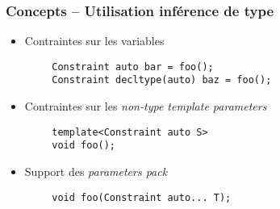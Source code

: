 \documentclass[C++.tex]{subfiles}
\begin{document}
\begin{frame}[fragile]
	\frametitle{Concepts -- Utilisation inférence de type}
	\begin{itemize}
		\item Contraintes sur les variables
	\end{itemize}

	\begin{verbatim}
		Constraint auto bar = foo();
		Constraint decltype(auto) baz = foo();
	\end{verbatim}

	\begin{itemize}
		\item Contraintes sur les \textit{non-type template parameters}
	\end{itemize}

	\begin{verbatim}
		template<Constraint auto S>
		void foo();
	\end{verbatim}

	\begin{itemize}
		\item Support des \textit{parameters pack}
	\end{itemize}

	\begin{verbatim}
		void foo(Constraint auto... T);
	\end{verbatim}
\end{frame}
\end{document}
